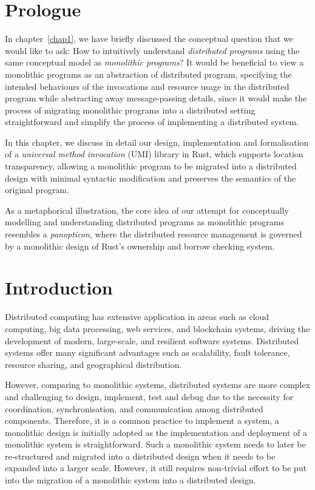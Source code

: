 \section{Prologue}
\label{chap3:prologue}
In chapter~\ref{chap1}, we have briefly discussed the conceptual question that we would like to ask: How to intuitively understand \emph{distributed programs} using the same conceptual model as \emph{monolithic programs}? It would be beneficial to view a monolithic programs as an abstraction of distributed program, specifying the intended behaviours of the invocations and resource usage in the distributed program while abstracting away message-passing details, since it would make the process of migrating monolithic programs into a distributed setting straightforward and simplify the process of implementing a distributed system.

In this chapter, we discuss in detail our design, implementation and formalisation of a \emph{universal method invocation} (UMI) library in Rust, which supports location transparency, allowing a monolithic program to be migrated into a distributed design with minimal syntactic modification and preserves the semantics of the original program.

As a metaphorical illustration, the core idea of our attempt for conceptually modelling and understanding distributed programs as monolithic programs resembles a \emph{panopticon}, where the distributed resource management is governed by a monolithic design of Rust's ownership and borrow checking system.

\section{Introduction}
\label{chap3:introduction}
Distributed computing has extensive application in areas such as cloud computing, big data processing, web services, and blockchain systems, driving the development of modern, large-scale, and resilient software systems. Distributed systems offer many significant advantages such as scalability, fault tolerance, resource sharing, and geographical distribution. 

However, comparing to monolithic systems, distributed systems are more complex and challenging to design, implement, test and debug due to the necessity for coordination, synchronisation, and communication among distributed components. Therefore, it is a common practice to implement a system, a monolithic design is initially adopted as the implementation and deployment of a monolithic system is straightforward. Such a monolithic system needs to later be re-structured and migrated into a distributed design when it needs to be expanded into a larger scale. However, it still requires non-trivial effort to be put into the migration of a monolithic system into a distributed design.

